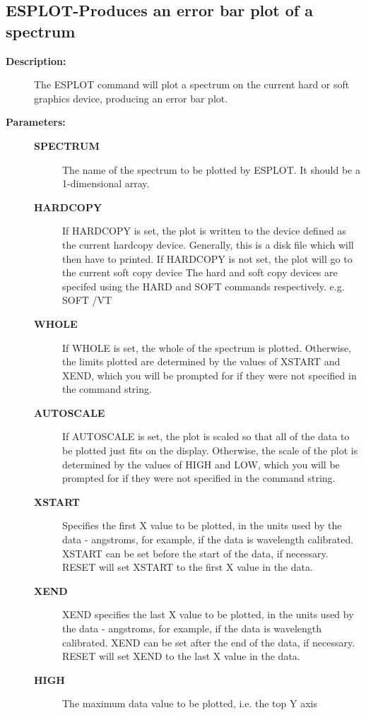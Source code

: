 \subsection{ESPLOT-\label{ESPLOT}Produces an error bar plot of a spectrum}
\begin{description}

\item [{\bf Description:}]
 The ESPLOT command will plot a spectrum on the current
 hard or soft graphics device, producing an error bar plot.

\item [{\bf Parameters:}]
\begin{description}
\item [{\bf SPECTRUM}]
 The name of the spectrum to be plotted by ESPLOT.
 It should be a 1-dimensional array.
\item [{\bf HARDCOPY}]
 If HARDCOPY is set, the plot is written to the device
 defined as the current hardcopy device.  Generally, this is
 a disk file which will then have to printed.  If HARDCOPY is
 not set, the plot will go to the current soft copy device
 The hard and soft copy devices are specifed using the HARD
 and SOFT commands respectively.  e.g. SOFT /VT
\item [{\bf WHOLE}]
 If WHOLE is set, the whole of the spectrum is plotted.
 Otherwise, the limits plotted are determined by the values of
 XSTART and XEND, which you will be prompted for if they were
 not specified in the command string.
\item [{\bf AUTOSCALE}]
 If AUTOSCALE is set, the plot is scaled so that all of
 the data to be plotted just fits on the display.  Otherwise,
 the scale of the plot is determined by the values of HIGH and
 LOW, which you will be prompted for if they were not specified
 in the command string.
\item [{\bf XSTART}]
 Specifies the first X value to be plotted, in the
 units used by the data - angstroms, for example, if the data
 is wavelength calibrated.  XSTART can be set before the start
 of the data, if necessary.  RESET will set XSTART to the first
 X value in the data.
\item [{\bf XEND}]
 XEND specifies the last X value to be plotted, in the units
 used by the data - angstroms, for example, if the data
 is wavelength calibrated.  XEND can be set after the end
 of the data, if necessary.  RESET will set XEND to the last
 X value in the data.
\item [{\bf HIGH}]
 The maximum data value to be plotted, i.e. the top Y axis

\end{description}
\end{description}
